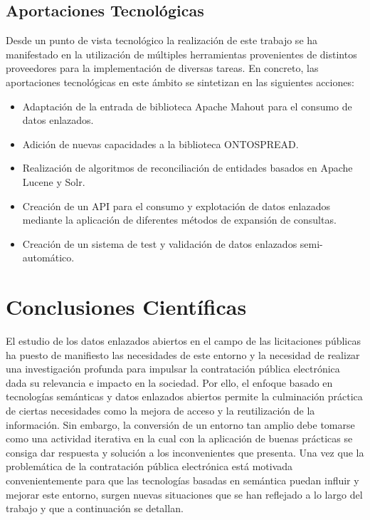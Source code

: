 \subsection{Aportaciones Tecnológicas}
Desde un punto de vista tecnológico la realización de este trabajo se ha manifestado en la utilización de múltiples herramientas 
provenientes de distintos proveedores para la implementación de diversas tareas. En concreto, las aportaciones tecnológicas 
en este ámbito se sintetizan en las siguientes acciones:

\begin{itemize}
 \item Adaptación de la entrada de biblioteca Apache \gls{Mahout} para el consumo de datos enlazados.
 \item Adición de nuevas capacidades a la biblioteca ONTOSPREAD.
 \item Realización de algoritmos de reconciliación de entidades basados en Apache \gls{Lucene} y \gls{Solr}.
 \item Creación de un API para el consumo y explotación de datos enlazados mediante la aplicación de diferentes 
métodos de expansión de consultas.
 \item Creación de un sistema de test y validación de datos enlazados semi-automático.
\end{itemize}

\section{Conclusiones Científicas}
El estudio de los datos enlazados abiertos en el campo de las licitaciones públicas ha puesto de manifiesto las necesidades 
de este entorno y la necesidad de realizar una investigación profunda para impulsar la contratación pública electrónica dada 
su relevancia e impacto en la sociedad. Por ello, el enfoque basado en tecnologías semánticas y datos enlazados abiertos 
permite la culminación práctica de ciertas necesidades como la mejora de acceso y la reutilización de la información. Sin embargo, 
la conversión de un entorno tan amplio debe tomarse como una actividad iterativa en la cual con la aplicación de buenas 
prácticas se consiga dar respuesta y solución a los inconvenientes que presenta. Una vez que la problemática de la contratación 
pública electrónica está motivada convenientemente para que las tecnologías basadas en semántica puedan influir y mejorar 
este entorno, surgen nuevas situaciones que se han reflejado a lo largo del trabajo y que a continuación se detallan.

